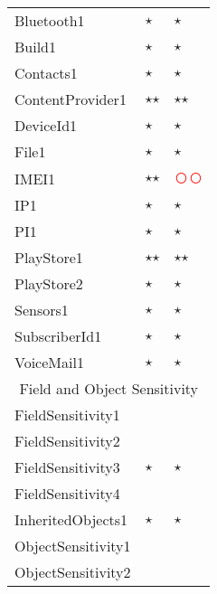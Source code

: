\documentclass[../draft.tex]{subfiles}
\newcommand{\fp}{\textcolor{white}{\textcircled{\textcolor{red}{$\star$}}}}
\newcommand{\fn}{\textcolor{red}{\textcircled{ }}}
\newcommand{\tp}[0]{\textcircled{$\star$}}
\newcommand{\tsub}[1]{\multicolumn{3}{c}{#1}\\\hline}
\begin{document}
\begin{longtable}{l | l | l}
        Bluetooth1 & \tp & \tp\\
        Build1 & \tp & \tp\\
        Contacts1 & \tp & \tp\\
        ContentProvider1 & \tp \tp & \tp \tp\\
        DeviceId1 & \tp & \tp\\
        File1 & \tp & \tp\\
        IMEI1 & \tp \tp & \fn \fn\\
        IP1 & \tp & \tp\\
        PI1 & \tp & \tp\\
        PlayStore1 & \tp \tp & \tp \tp\\
        PlayStore2 & \tp & \tp\\
        Sensors1 & \tp & \tp\\
        SubscriberId1 & \tp & \tp\\
        VoiceMail1 & \tp & \tp\\
        \hline
        \tsub{Field and Object Sensitivity}
        FieldSensitivity1 & & \\
        FieldSensitivity2 & & \\
        FieldSensitivity3 & \tp & \tp\\
        FieldSensitivity4 & & \\
        InheritedObjects1 & \tp & \tp\\
        ObjectSensitivity1 & & \\
        ObjectSensitivity2 & & \\
        \hline

\end{longtable}
\end{document}
